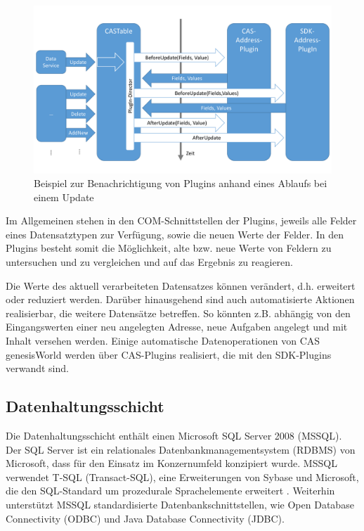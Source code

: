 \begin{figure}[H]
	\centering
  \includegraphics[width=1.0\textwidth, width=1.0\textwidth]{pics/analyse_plugins.pdf}
	\caption{Beispiel zur Benachrichtigung von Plugins anhand eines Ablaufs bei einem Update}
	\label{gw_plugin}
\end{figure}

Im Allgemeinen stehen in den COM-Schnittstellen der Plugins, jeweils alle Felder eines Datensatztypen zur Verfügung, sowie die neuen Werte der Felder. In den Plugins besteht somit die Möglichkeit, alte bzw. neue Werte von Feldern zu untersuchen und zu vergleichen und auf das Ergebnis zu reagieren.

Die Werte des aktuell verarbeiteten Datensatzes können verändert, d.h. erweitert oder reduziert werden. Darüber hinausgehend sind auch automatisierte Aktionen realisierbar, die weitere Datensätze betreffen. So könnten z.B. abhängig von den Eingangswerten einer neu angelegten Adresse, neue Aufgaben angelegt und mit Inhalt versehen werden. Einige automatische Datenoperationen von CAS genesisWorld werden über CAS-Plugins realisiert, die mit den SDK-Plugins verwandt sind.

\subsection{Datenhaltungsschicht}
\label{ch:Systemanalyse:sec:genesisWorld:subsec:db}

Die Datenhaltungsschicht enthält einen Microsoft SQL Server 2008 (MSSQL). Der SQL Server ist ein relationales Datenbankmanagementsystem (RDBMS) von Microsoft, dass für den Einsatz im Konzernumfeld konzipiert wurde. MSSQL verwendet T-SQL (Transact-SQL), eine Erweiterungen von Sybase und Microsoft, die den SQL-Standard um prozedurale Sprachelemente erweitert \cite{tech2013}. Weiterhin unterstützt MSSQL standardisierte Datenbankschnittstellen, wie Open Database Connectivity (ODBC) und Java Database Connectivity (JDBC).

